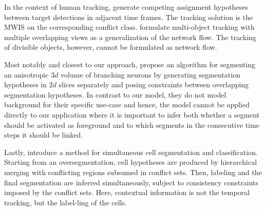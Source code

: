 In the context of human tracking, \citet{brendel_11_multiobject} generate competing assignment
hypotheses between target detections in adjacent time frames. The tracking solution is the MWIS on
the corresponding conflict class. \citet{hofmann_13_hypergraphs} formulate multi-object tracking
with multiple overlapping views as a generalization of the network flow. The tracking of divisible
objects, however, cannot be formulated as network flow.

Most notably and closest to our approach, \citet{funke_12_efficient} propose an algorithm for
segmenting an anisotropic $3d$ volume of branching neurons by generating segmentation hypotheses in
$2d$ slices separately and posing constraints between overlapping segmentation hypotheses. In
contrast to our model, they do not model background for their specific use-case and hence, the model
cannot be applied directly to our application where it is important to infer both whether a segment
should be activated as foreground and to which segments in the consecutive time steps it should be
linked.

Lastly, \citet{liu_13_joint} introduce a method for simultaneous cell segmentation and
classification. Starting from an oversegmentation, cell hypotheses are produced by hierarchical
merging with conflicting regions subsumed in conflict sets. Then, labeling and the final
segmentation are inferred simultaneously, subject to consistency constraints imposed by the conflict
sets. Here, contextual information is not the temporal tracking, but the label-ling of the cells.






